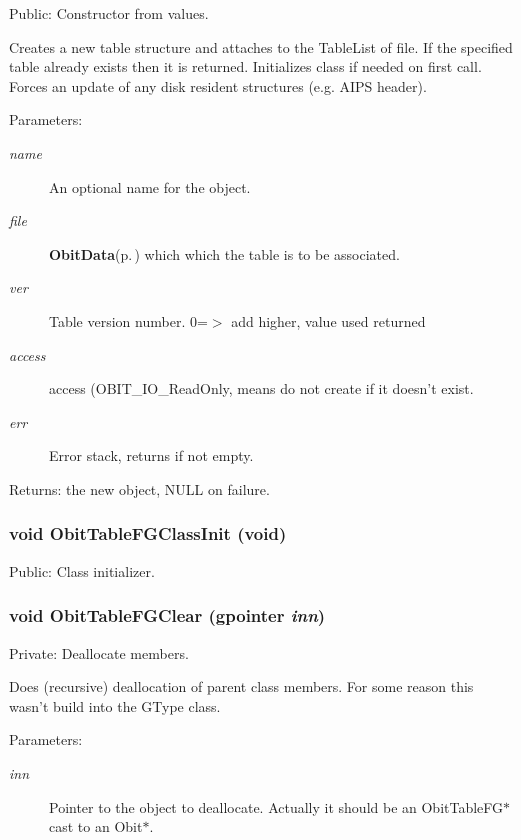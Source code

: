 Public: Constructor from values. 

Creates a new table structure and attaches to the Table\-List of file. If the specified table already exists then it is returned. Initializes class if needed on first call. Forces an update of any disk resident structures (e.g. AIPS header). \begin{Desc}
\item[Parameters:]
\begin{description}
\item[{\em name}]An optional name for the object. \item[{\em file}]{\bf Obit\-Data}{\rm (p.\,\pageref{structObitData})} which which the table is to be associated. \item[{\em ver}]Table version number. 0=$>$ add higher, value used returned \item[{\em access}]access (OBIT\_\-IO\_\-Read\-Only, means do not create if it doesn't exist. \item[{\em err}]Error stack, returns if not empty. \end{description}
\end{Desc}
\begin{Desc}
\item[Returns:]the new object, NULL on failure. \end{Desc}
\subsubsection{\setlength{\rightskip}{0pt plus 5cm}void Obit\-Table\-FGClass\-Init (void)}\label{ObitTableFG_8c_a27}


Public: Class initializer. 

\subsubsection{\setlength{\rightskip}{0pt plus 5cm}void Obit\-Table\-FGClear (gpointer {\em inn})}\label{ObitTableFG_8c_a9}


Private: Deallocate members. 

Does (recursive) deallocation of parent class members. For some reason this wasn't build into the GType class. \begin{Desc}
\item[Parameters:]
\begin{description}
\item[{\em inn}]Pointer to the object to deallocate. Actually it should be an Obit\-Table\-FG$\ast$ cast to an Obit$\ast$. \end{description}
\end{Desc}
